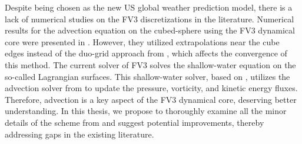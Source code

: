 Despite being chosen as the new US global weather prediction model, there is a lack of numerical studies on the FV3 discretizations in the literature.
Numerical results for the advection equation on the cubed-sphere using the FV3 dynamical core were presented in \citet{putman:2007}.
However, they utilized extrapolations near the cube edges instead of the duo-grid approach from \citet{mouallem:2023}, which affects the convergence of this method.
The current solver of FV3 solves the shallow-water equation on the so-called Lagrangian surfaces.
This shallow-water solver, based on \citet{lin:1997}, 
utilizes the advection solver from \citet{putman:2007} to update the pressure, vorticity, and kinetic energy fluxes.
Therefore, advection is a key aspect of the FV3 dynamical core, deserving better understanding. 
In this thesis, we propose to thoroughly examine all the minor details of the scheme from \citet{putman:2007} and suggest potential improvements, 
thereby addressing gaps in the existing literature.


